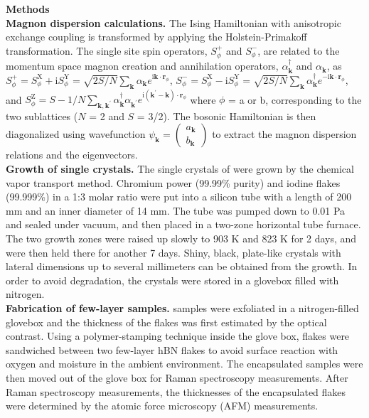 \documentclass[prl, preprint, superscriptaddress]{revtex4-1}
\begin{document}
\noindent \textbf{Methods}\\
\noindent\textbf{Magnon dispersion calculations.} The Ising Hamiltonian with anisotropic exchange coupling is transformed by applying the Holstein-Primakoff transformation. The single site spin operators, $S^{+}_\phi$ and $S^{-}_\phi$, are related to the momentum space magnon creation and annihilation operators, $\alpha^{\dagger}_\textbf{k}$ and $\alpha_\textbf{k}$, as $S^{+}_\phi = S^\mathrm{X}_\phi + \mathrm{i}S^\mathrm{Y}_\phi = \sqrt{2S/N} \sum_\textbf{k}\alpha_\textbf{k}e^{\mathrm{i}\textbf{k}\cdot\textbf{r}_\phi}$, $S^{-}_\phi = S^\mathrm{X}_\phi - \mathrm{i}S^\mathrm{Y}_\phi = \sqrt{2S/N} \sum_\textbf{k}\alpha^{\dagger}_\textbf{k}e^{-\mathrm{i}\textbf{k}\cdot\textbf{r}_\phi}$, and $S^\mathrm{Z}_\phi = S - 1/N \sum_{\textbf{k},\textbf{k}^{\prime}} \alpha^{\dagger}_\textbf{k} \alpha_{\textbf{k}^\prime} e^{\mathrm{i}(\textbf{k}^\prime -\textbf{k})\cdot \textbf{r}_\phi}$ where $\phi$ = a or b, corresponding to the two  sublattices ($N$ = 2 and $S$ = 3/2). The bosonic Hamiltonian is then diagonalized using wavefunction $\psi_\textbf{k} = \begin{pmatrix} a_\textbf{k} \\ b_\textbf{k} \end{pmatrix}$ to extract the magnon dispersion relations and the eigenvectors.\\

\noindent \textbf{Growth of  single crystals.} The single crystals of  were grown by the chemical vapor transport method. Chromium power (99.99\% purity) and iodine flakes (99.999\%) in a 1:3 molar ratio were put into a silicon tube with a length of 200 mm and an inner diameter of 14 mm. The tube was pumped down to 0.01 Pa and sealed under vacuum, and then placed in a two-zone horizontal tube furnace. The two growth zones were raised up slowly to 903 K and 823 K for 2 days, and were then held there for another 7 days. Shiny, black, plate-like crystals with lateral dimensions up to several millimeters can be obtained from the growth. In order to avoid degradation, the  crystals were stored in a glovebox filled with nitrogen. \\

\noindent \textbf{Fabrication of few-layer samples.}  samples were exfoliated in a nitrogen-filled glovebox and the thickness of the flakes was first estimated by the optical contrast. Using a polymer-stamping technique inside the glove box,  flakes were sandwiched between two few-layer hBN flakes to avoid surface reaction with oxygen and moisture in the ambient environment. The encapsulated  samples were then moved out of the glove box for Raman spectroscopy measurements. After Raman spectroscopy measurements, the thicknesses of the encapsulated  flakes were determined by the atomic force microscopy (AFM) measurements. \\
\end{document}
